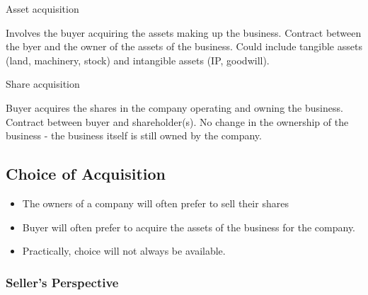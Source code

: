 \documentclass[
]{article}
\providecommand{\tightlist}{%
  \setlength{\itemsep}{0pt}\setlength{\parskip}{0pt}}
\begin{document}
Asset acquisition

Involves the buyer acquiring the assets making up the business. Contract
between the byer and the owner of the assets of the business. Could
include tangible assets (land, machinery, stock) and intangible assets
(IP, goodwill).

Share acquisition

Buyer acquires the shares in the company operating and owning the
business. Contract between buyer and shareholder(s). No change in the
ownership of the business - the business itself is still owned by the
company.

\hypertarget{choice-of-acquisition}{%
\subsection{Choice of Acquisition}\label{choice-of-acquisition}}

\begin{itemize}
\tightlist
\item
  The owners of a company will often prefer to sell their shares
\item
  Buyer will often prefer to acquire the assets of the business for the
  company.
\item
  Practically, choice will not always be available.
\end{itemize}

\hypertarget{sellers-perspective}{%
\subsubsection{Seller's Perspective}\label{sellers-perspective}}
\end{document}
